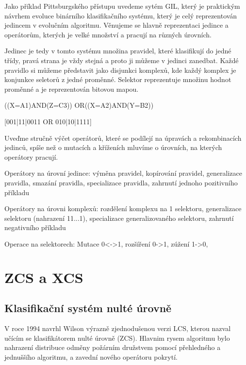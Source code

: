 Jako příklad Pittsburgského přístupu uvedeme sytém GIL, který je praktickým návrhem evoluce binárního klasifikačního systému, který je celý reprezentován jedincem v evolučním algoritmu. Věnujeme se hlavně reprezentaci jedince a operátorům, kterých je velké množství a pracují na různých úrovních.

Jedinec je tedy v tomto systému množina pravidel, které klasifikují do jedné třídy, pravá strana je vždy stejná a proto ji můžeme v jedinci zanedbat. Každé pravidlo si můžeme představit jako disjunkci komplexů, kde každý komplex je konjunkce seletorů z jedné proměnné. Selektor reprezentuje množinu hodnot proměnné a je reprezentován bitovou mapou. 

((X=A1)AND(Z=C3)) OR((X=A2)AND(Y=B2))

[001|11|0011 OR 010|10|1111]

Uveďme stručně výčet operátorů, které se podílejí na úpravách a rekombinacích jedinců, spíše než o mutacích a kříženích mluvíme o úrovních, na kterých operátory pracují.

\begin{description}

\item{Operátory na úrovní jedince:}
výměna pravidel, kopírování pravidel, generalizace pravidla, smazání pravidla, specializace pravidla, zahrnutí jednoho pozitivního příkladu

\item{Operátory na úrovni komplexů:} 
rozdělení komplexu na 1 selektoru, generalizace selektoru (nahrazení 11...1), specializace generalizovaného selektoru, zahrnutí negativního příkladu

\item{Operace na selektorech:}
Mutace 0<->1, rozšíření 0->1, zúžení 1->0, 

\end{description}


\section{ZCS a XCS}

\subsection{Klasifikační systém nulté úrovně}

V roce 1994 navrhl Wilson výrazně zjednodušenou verzi LCS, kterou nazval učícím se klasifikátorem nulté úrovně (ZCS). Hlavnim rysem algoritmu bylo nahrazení distribuce odměny požárním družstvem pomocí přehledného a jednuššího algoritmu, a zavední nového operátoru pokrytí. 


